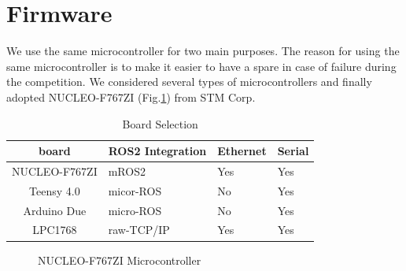 \documentclass[lettersize,journal]{IEEEtran}
\begin{document}
\section{Firmware}
We use the same microcontroller for two main purposes.
The reason for using the same microcontroller is to make it easier to have a spare in case of failure during the competition.
We considered several types of microcontrollers and finally adopted NUCLEO-F767ZI (Fig.\ref{fig:f767zi}) from STM Corp.

\begin{table}[H]
    \caption{Board Selection}
    \label{table:board_selection}
    \centering
     \begin{tabular}{clll}
      \hline
      board & ROS2 Integration & Ethernet & Serial \\
      \hline \hline
      NUCLEO-F767ZI & mROS2 & Yes & Yes \\
      Teensy 4.0 & micor-ROS & No & Yes \\
      Arduino Due & micro-ROS & No & Yes \\
      LPC1768 & raw-TCP/IP & Yes & Yes \\
      \hline
     \end{tabular}
\end{table}

\begin{figure}[H]
    \begin{center}
  \end{center}
  \caption{NUCLEO-F767ZI Microcontroller}
  \label{fig:f767zi}
\end{figure}
\end{document}
